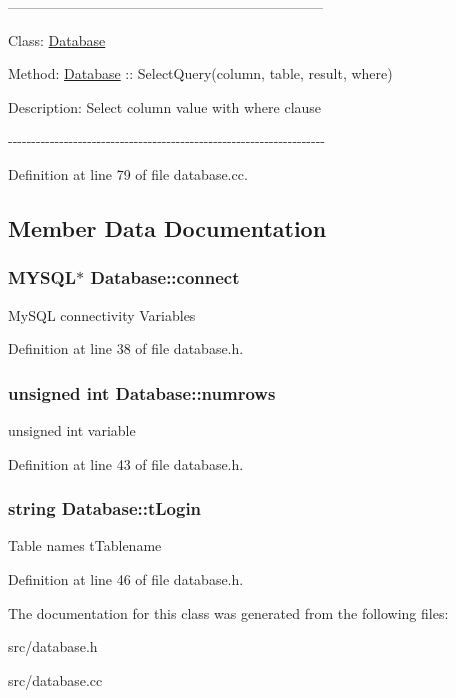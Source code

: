 --------------------------------------------------------------------\par
 Class\-: \hyperlink{classDatabase}{Database} \par
 Method\-: \hyperlink{classDatabase}{Database} \-:\-: Select\-Query(column, table, result, where) \par
 Description\-: Select column value with where clause \par
 -\/-\/-\/-\/-\/-\/-\/-\/-\/-\/-\/-\/-\/-\/-\/-\/-\/-\/-\/-\/-\/-\/-\/-\/-\/-\/-\/-\/-\/-\/-\/-\/-\/-\/-\/-\/-\/-\/-\/-\/-\/-\/-\/-\/-\/-\/-\/-\/-\/-\/-\/-\/-\/-\/-\/-\/-\/-\/-\/-\/-\/-\/-\/-\/-\/-\/-\/-\/ 

Definition at line 79 of file database.\-cc.



\subsection{Member Data Documentation}
\hypertarget{classDatabase_aa232b806b05ef654cd5579bca5f1dbad}{
\subsubsection[{connect}]{\setlength{\rightskip}{0pt plus 5cm}M\-Y\-S\-Q\-L$\ast$ Database\-::connect\hspace{0.3cm}{\ttfamily [protected]}}}\label{classDatabase_aa232b806b05ef654cd5579bca5f1dbad}
My\-S\-Q\-L connectivity Variables 

Definition at line 38 of file database.\-h.

\hypertarget{classDatabase_a02965883689dd1d8007c86cebf6df89e}{
\subsubsection[{numrows}]{\setlength{\rightskip}{0pt plus 5cm}unsigned int Database\-::numrows\hspace{0.3cm}{\ttfamily [protected]}}}\label{classDatabase_a02965883689dd1d8007c86cebf6df89e}
unsigned int variable 

Definition at line 43 of file database.\-h.

\hypertarget{classDatabase_acd64ff0e98b28cd1c6928a1236634521}{
\subsubsection[{t\-Login}]{\setlength{\rightskip}{0pt plus 5cm}string Database\-::t\-Login\hspace{0.3cm}{\ttfamily [protected]}}}\label{classDatabase_acd64ff0e98b28cd1c6928a1236634521}
Table names t\-Tablename 

Definition at line 46 of file database.\-h.



The documentation for this class was generated from the following files\-:\begin{DoxyCompactItemize}
\item 
src/database.\-h\item 
src/database.\-cc\end{DoxyCompactItemize}
